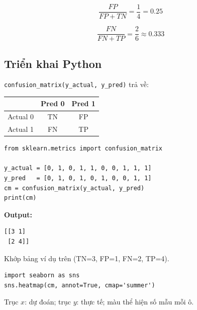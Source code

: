 \begin{tinhchat}[title={Type I Error Rate}]
\[
\frac{FP}{FP+TN} = \frac{1}{4} = 0.25
\]
\end{tinhchat}

\begin{tinhchat}[title={Type II Error Rate}]
\[
\frac{FN}{FN+TP} = \frac{2}{6} \approx 0.333
\]
\end{tinhchat}

\subsection{Triển khai Python}

\begin{luuy}[title={Thứ tự ma trận sklearn}]
\texttt{confusion\_matrix(y\_actual, y\_pred)} trả về:
\begin{center}
\begin{tabular}{c|cc}
 & Pred 0 & Pred 1 \\
\hline
Actual 0 & TN & FP \\
Actual 1 & FN & TP \\
\end{tabular}
\end{center}
\end{luuy}

\begin{vidu}[title={confusion\_matrix}]
\begin{lstlisting}
from sklearn.metrics import confusion_matrix

y_actual = [0, 1, 0, 1, 1, 0, 0, 1, 1, 1]
y_pred   = [0, 1, 0, 1, 0, 1, 0, 0, 1, 1]
cm = confusion_matrix(y_actual, y_pred)
print(cm)
\end{lstlisting}

\textbf{Output:}
\begin{verbatim}
[[3 1]
 [2 4]]
\end{verbatim}
Khớp bảng ví dụ trên (TN=3, FP=1, FN=2, TP=4).
\end{vidu}

\begin{vidu}[title={Heatmap với seaborn}]
\begin{lstlisting}
import seaborn as sns
sns.heatmap(cm, annot=True, cmap='summer')
\end{lstlisting}

Trục $x$: dự đoán; trục $y$: thực tế; màu thể hiện số mẫu mỗi ô.
\end{vidu}
